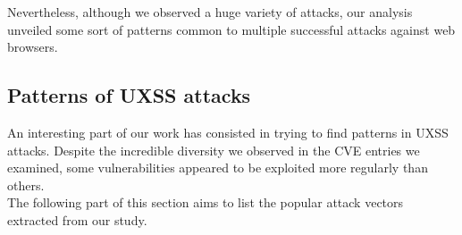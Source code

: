 \documentclass[journal]{IEEEtran}
\begin{document}
\medskip

Nevertheless, although we observed a huge variety of attacks, our analysis unveiled some sort of patterns common to multiple successful attacks against web browsers.

\subsection{Patterns of UXSS attacks}

An interesting part of our work has consisted in trying to find patterns in UXSS attacks. Despite the incredible diversity we observed in the CVE entries we examined, some vulnerabilities appeared to be exploited more regularly than others. \\
The following part of this section aims to list the popular attack vectors extracted from our study.

\medskip
\end{document}
